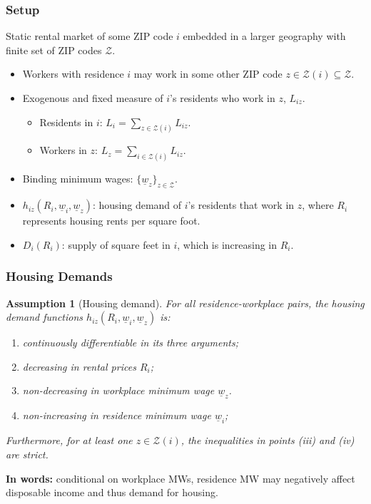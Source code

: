\documentclass[aspectratio=169, t]{beamer}
\newtheorem{assu}{Assumption}
\newcommand{\Z}{\mathcal{Z}}
\newcommand{\MW}{\underline{w}}
\begin{document}
\begin{frame}
    \frametitle{Setup}
    
    Static rental market of some ZIP code $i$ embedded in a larger geography with finite
	set of ZIP codes $\Z$.    
    \begin{itemize}
		\vspace{2mm}
		\item Workers with residence $i$ may work in some other ZIP code $z\in\Z(i)\subseteq\Z$.

		\pause
		\vspace{2mm}
		\item Exogenous and fixed measure of $i$'s residents who work in $z$, $L_{iz}$.
		\begin{itemize}
			\item Residents in $i$: $L_i = \sum_{z \in \Z(i)} L_{iz}$.
			\item Workers in $z$: $L_z = \sum_{i \in \Z(i)} L_{iz}$.
		\end{itemize}
	
		\pause
		\vspace{2mm}
		\item Binding minimum wages: $\{\MW_z\}_{z\in\Z}$.
		
		\pause
		\vspace{2mm}
		\item $h_{i z} (R_i, \MW_i, \MW_z)$: housing demand of $i$'s residents that work in $z$, where $R_i$ 
		represents housing rents per square foot.

		\pause
		\vspace{2mm}
		\item $D_i \left(R_i \right)$: supply of square feet in $i$, which is increasing in $R_i$.

	\end{itemize}
\end{frame}

\begin{frame}
    \frametitle{Housing Demands}
   
	\begin{assu}[Housing demand]\label{assu:housing_function}
		For all residence-workplace pairs, the housing demand functions $h_{iz} (R_i, \MW_i, \MW_z)$ is:
		\begin{enumerate}
			\item continuously differentiable in its three arguments;
			\item decreasing in rental prices $R_i$;
			\item non-decreasing in workplace minimum wage $\MW_z$.
			\item non-increasing in residence minimum wage $\MW_i$;
		\end{enumerate}
		Furthermore, for at least one $z\in\Z(i)$, the inequalities in points (iii)
		and (iv) are strict.
	\end{assu}

	\pause 
	\vspace{2mm}

	\textbf{In words:} conditional on workplace MWs, residence MW may negatively affect disposable income
	and thus demand for housing.
\end{frame}
\end{document}
